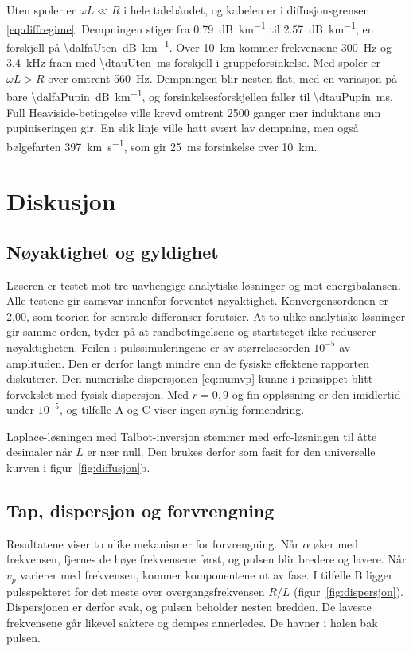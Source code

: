 \documentclass[11pt,a4paper]{article}
\numberwithin{equation}{section}
\numberwithin{figure}{section}
\numberwithin{table}{section}
\begin{document}
Uten spoler er $\omega L \ll R$ i hele talebåndet, og kabelen er i
diffusjonsgrensen \eqref{eq:diffregime}. Dempningen stiger fra
\SI{0.79}{\deci\bel\per\kilo\metre} til \SI{2.57}{\deci\bel\per\kilo\metre}, en
forskjell på \SI{\dalfaUten}{\deci\bel\per\kilo\metre}. Over \SI{10}{\kilo\metre}
kommer frekvensene \SI{300}{\hertz} og \SI{3.4}{\kilo\hertz} fram med
\SI{\dtauUten}{\milli\second} forskjell i gruppeforsinkelse. Med spoler er
$\omega L > R$ over omtrent \SI{560}{\hertz}. Dempningen blir nesten flat, med
en variasjon på bare \SI{\dalfaPupin}{\deci\bel\per\kilo\metre}, og
forsinkelsesforskjellen faller til \SI{\dtauPupin}{\milli\second}. Full
Heaviside-betingelse ville krevd omtrent 2500 ganger mer induktans enn
pupiniseringen gir. En slik linje ville hatt svært lav dempning, men også
bølgefarten \SI{397}{\kilo\metre\per\second}, som gir \SI{25}{\milli\second}
forsinkelse over \SI{10}{\kilo\metre}.

\section{Diskusjon}\label{sec:diskusjon}

\subsection{Nøyaktighet og gyldighet}
Løseren er testet mot tre uavhengige analytiske løsninger og mot energibalansen.
Alle testene gir samsvar innenfor forventet nøyaktighet. Konvergensordenen er
2,00, som teorien for sentrale differanser forutsier. At to ulike analytiske
løsninger gir samme orden, tyder på at randbetingelsene og startsteget ikke
reduserer nøyaktigheten. Feilen i pulssimuleringene er av størrelsesorden
$10^{-5}$ av amplituden. Den er derfor langt mindre enn de fysiske effektene
rapporten diskuterer. Den numeriske dispersjonen \eqref{eq:numvp} kunne i
prinsippet blitt forvekslet med fysisk dispersjon. Med $r = 0{,}9$ og fin
oppløsning er den imidlertid under $10^{-5}$, og tilfelle A og C viser ingen
synlig formendring.

Laplace-løsningen med Talbot-inversjon stemmer med erfc-løsningen til åtte
desimaler når $L$ er nær null. Den brukes derfor som fasit for den universelle
kurven i figur~\ref{fig:diffusjon}b.

\subsection{Tap, dispersjon og forvrengning}
Resultatene viser to ulike mekanismer for forvrengning. Når $\alpha$ øker med
frekvensen, fjernes de høye frekvensene først, og pulsen blir bredere og
lavere. Når $v_p$ varierer med frekvensen, kommer komponentene ut av fase.
I tilfelle B ligger pulsspekteret for det meste over overgangsfrekvensen
$R/L$ (figur~\ref{fig:dispersjon}). Dispersjonen er derfor svak, og pulsen
beholder nesten bredden. De laveste frekvensene går likevel saktere og dempes
annerledes. De havner i halen bak pulsen.
\end{document}
